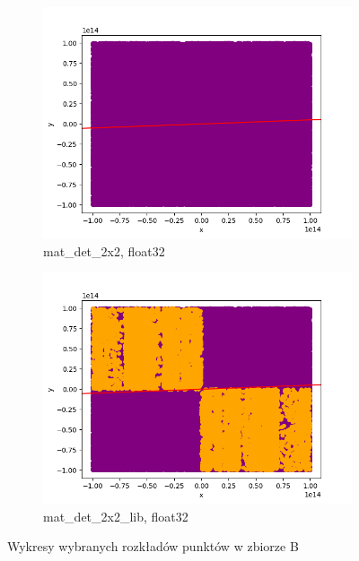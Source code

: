 \documentclass[11pt,a4paper]{article}
\begin{document}
\begin{figure}[H]
\begin{subfigure}[b]{0.46\textwidth}
        \centering
        \includegraphics[scale=0.49]{res/rec2_mat_det_2x2_float32_0.png}
        \caption{\ttfamily\arraybackslash mat\_det\_2x2, float32}
    \end{subfigure}
    \begin{subfigure}[b]{0.46\textwidth}
        \centering
        \includegraphics[scale=0.49]{res/rec2_mat_det_2x2_lib_float32_0.png}
        \caption{\ttfamily\arraybackslash mat\_det\_2x2\_lib, float32}
    \end{subfigure}
    \caption{Wykresy wybranych rozkładów punktów w zbiorze B}
\end{figure}
\end{document}
